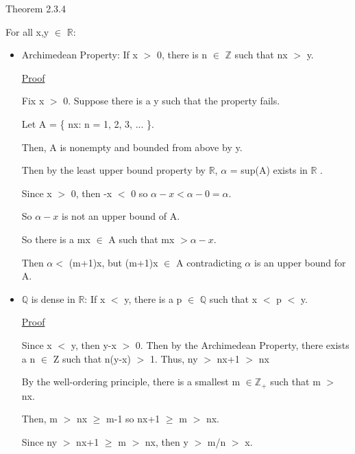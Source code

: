 {\color{red} Theorem 2.3.4}

	For all x,y $\in$ $ \mathbb{R} $:
	\begin{itemize}[leftmargin=1cm, itemsep=0.4em]
		\item {\color{lblue} Archimedean Property}:
			If x $>$ 0, there is n $\in$ $ \mathbb{Z} $ such that nx $>$ y.
	
			{ \color{magenta} \underline{Proof} }

				Fix x $>$ 0. Suppose there is a y such that the property fails.

				Let A = \{ nx: n = 1, 2, 3, ... \}.

				Then, A is nonempty and bounded from above by y.

				Then by the least upper bound property by $ \mathbb{R} $,
				$\alpha$ = sup(A) exists in $ \mathbb{R} $ .

				Since x $>$ 0, then -x $<$ 0 so $\alpha - x < \alpha-0 = \alpha$.

				So $\alpha-x$ is not an upper bound of A.

				So there is a mx $\in$ A such that mx $> \alpha-x$.

				Then $\alpha <$ (m+1)x, but (m+1)x $\in$ A
				contradicting $\alpha$ is an upper bound for A.

		\item {\color{lblue} $ \mathbb{Q} $  is dense in $ \mathbb{R} $}:
			If x $<$ y, there is a p $\in$ $ \mathbb{Q} $ such that x $<$ p $<$ y.

			{ \color{magenta} \underline{Proof} }

				Since x $<$ y, then y-x $>$ 0. Then by the Archimedean Property,
				there exists a n $\in$ Z such that n(y-x) $>$ 1. Thus, ny $>$ nx+1 $>$ nx

				By the well-ordering principle, there is a smallest m $\in \mathbb{Z_+} $
				such that m $>$ nx.

				Then, m $>$ nx $\geq$ m-1 so nx+1 $\geq$ m $>$ nx.

				Since ny $>$ nx+1 $\geq$ m $>$ nx, then y $>$ m/n $>$ x.
\end{itemize}
